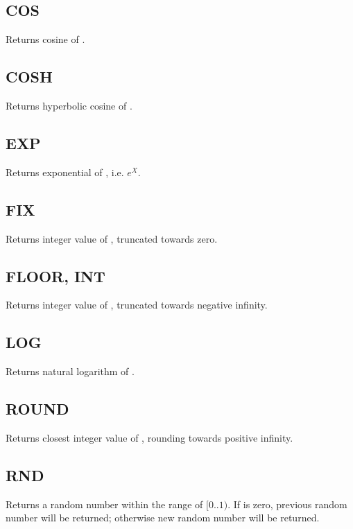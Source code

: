     \subsection{COS}
        \par
        Returns cosine of .
    \subsection{COSH}
        \par
        Returns hyperbolic cosine of .
    \subsection{EXP}
        \par
        Returns exponential of , i.e. $e^X$.
    \subsection{FIX}
        \par
        Returns integer value of , truncated towards zero.
    \subsection{FLOOR, INT}
        \par
        Returns integer value of , truncated towards negative infinity.
    \subsection{LOG}
        \par
        Returns natural logarithm of .
    \subsection{ROUND}
        \par
        Returns closest integer value of , rounding towards positive infinity.
    \subsection{RND}
        \par
        Returns a random number within the range of $[0..1)$. If  is zero, previous random number will be returned; otherwise new random number will be returned.
